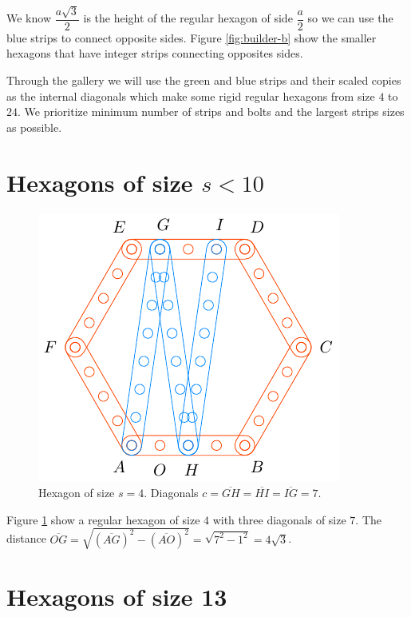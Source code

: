 \documentclass[11pt]{article}
\begin{document}
We know $\dfrac{a\sqrt3}2$ is the height of the regular hexagon of side $\dfrac{a}2$ so we can use the blue strips to connect opposite sides. Figure \ref{fig:builder-b} show the smaller hexagons that have integer strips connecting opposites sides.

Through the gallery we will use the green and blue strips and their scaled copies as the internal diagonals which make some rigid regular hexagons from size $4$ to $24$. We prioritize minimum number of strips and bolts and the largest strips sizes as possible.

\section{Hexagons of size $s < 10$}

\begin{figure}[H]
\centering
\includegraphics[scale=1]{4/hexa-4a}
\caption{Hexagon of size $s = 4$. Diagonals $c = \overline{GH} = \overline{HI} = \overline{IG} = 7$.}
\label{fig:4a}
\end{figure}

Figure \ref{fig:4a} show a regular hexagon of size $4$ with three diagonals of size $7$. The distance $\overline{OG} = \sqrt{(\overline{AG})^2 - (\overline{AO})^2} = \sqrt{7^2 - 1^2} = 4\sqrt3$.


\section{Hexagons of size 13}
\end{document}
